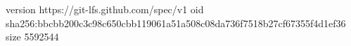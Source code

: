 version https://git-lfs.github.com/spec/v1
oid sha256:bbcbb200c3c98c650cbb119061a51a508c08da736f7518b27cf67355f4d1ef36
size 5592544
